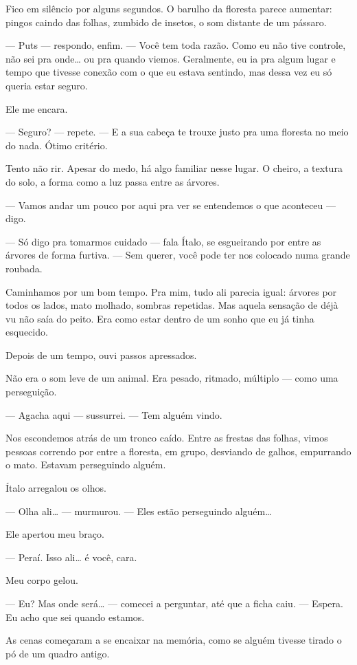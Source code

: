 Fico em silêncio por alguns segundos.  
O barulho da floresta parece aumentar: pingos caindo das folhas, zumbido de insetos, o som distante de um pássaro.

— Puts — respondo, enfim. — Você tem toda razão.  
Como eu não tive controle, não sei pra onde… ou pra quando viemos.  
Geralmente, eu ia pra algum lugar e tempo que tivesse conexão com o que eu estava sentindo, mas dessa vez eu só queria estar seguro.

Ele me encara.

— Seguro? — repete. — E a sua cabeça te trouxe justo pra uma floresta no meio do nada. Ótimo critério.

Tento não rir.  
Apesar do medo, há algo familiar nesse lugar.  
O cheiro, a textura do solo, a forma como a luz passa entre as árvores.

— Vamos andar um pouco por aqui pra ver se entendemos o que aconteceu — digo.

— Só digo pra tomarmos cuidado — fala Ítalo, se esgueirando por entre as árvores de forma furtiva. — Sem querer, você pode ter nos colocado numa grande roubada.

Caminhamos por um bom tempo.  
Pra mim, tudo ali parecia igual: árvores por todos os lados, mato molhado, sombras repetidas.  
Mas aquela sensação de déjà vu não saía do peito.  
Era como estar dentro de um sonho que eu já tinha esquecido.

Depois de um tempo, ouvi passos apressados.

Não era o som leve de um animal.  
Era pesado, ritmado, múltiplo — como uma perseguição.

— Agacha aqui — sussurrei. — Tem alguém vindo.

Nos escondemos atrás de um tronco caído.  
Entre as frestas das folhas, vimos pessoas correndo por entre a floresta, em grupo, desviando de galhos, empurrando o mato.  
Estavam perseguindo alguém.

Ítalo arregalou os olhos.

— Olha ali… — murmurou. — Eles estão perseguindo alguém…

Ele apertou meu braço.

— Peraí.  
Isso ali… é você, cara.

Meu corpo gelou.

— Eu? Mas onde será… — comecei a perguntar, até que a ficha caiu. — Espera. Eu acho que sei quando estamos.

As cenas começaram a se encaixar na memória, como se alguém tivesse tirado o pó de um quadro antigo.

